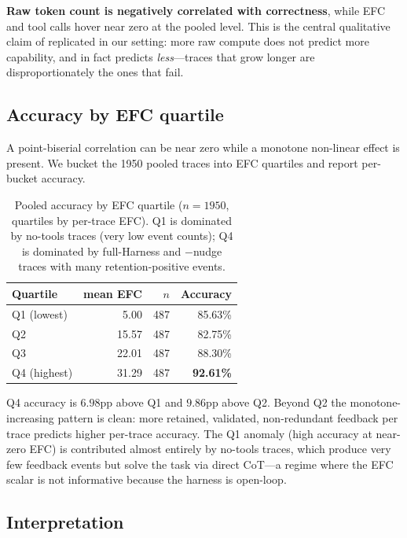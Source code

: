 \documentclass[10pt]{article}
\begin{document}
\textbf{Raw token count is negatively correlated with correctness}, while EFC and tool calls hover near zero at the pooled level. This is the central qualitative claim of \citep{efc2026} replicated in our setting: more raw compute does not predict more capability, and in fact predicts \emph{less}---traces that grow longer are disproportionately the ones that fail.

\subsection{Accuracy by EFC quartile}

A point-biserial correlation can be near zero while a monotone non-linear effect is present. We bucket the 1950 pooled traces into EFC quartiles and report per-bucket accuracy.

\begin{table}[h]
\centering
\caption{Pooled accuracy by EFC quartile ($n=1950$, quartiles by per-trace EFC). Q1 is dominated by no-tools traces (very low event counts); Q4 is dominated by full-Harness and $-$nudge traces with many retention-positive events.}
\label{tab:efc-quartile}
\begin{tabular}{lrrr}
\toprule
Quartile & mean EFC & $n$ & Accuracy \\
\midrule
Q1 (lowest) & 5.00 & 487 & 85.63\% \\
Q2 & 15.57 & 487 & 82.75\% \\
Q3 & 22.01 & 487 & 88.30\% \\
Q4 (highest) & 31.29 & 487 & \textbf{92.61\%} \\
\bottomrule
\end{tabular}
\end{table}

Q4 accuracy is $6.98$pp above Q1 and $9.86$pp above Q2. Beyond Q2 the monotone-increasing pattern is clean: more retained, validated, non-redundant feedback per trace predicts higher per-trace accuracy. The Q1 anomaly (high accuracy at near-zero EFC) is contributed almost entirely by no-tools traces, which produce very few feedback events but solve the task via direct CoT---a regime where the EFC scalar is not informative because the harness is open-loop.

\subsection{Interpretation}
\end{document}
